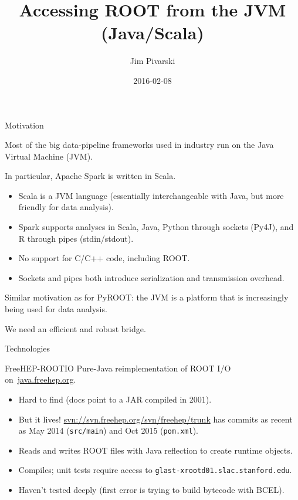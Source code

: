 \documentclass{beamer}
\title[2016-02-08-ROOT-JVM-firsttalk]{Accessing ROOT from the JVM (Java/Scala)}
\author{Jim Pivarski}
\date{2016-02-08}
\begin{document}
\begin{frame}
  \titlepage
\end{frame}


\begin{frame}{Motivation}
\begin{block}{}
Most of the big data-pipeline frameworks used in industry run on the Java Virtual Machine (JVM).
\end{block}

\begin{block}{}
\vspace{-\baselineskip}
In particular, Apache Spark is written in Scala.
\begin{itemize}
\item Scala is a JVM language (essentially interchangeable with Java, but more friendly for data analysis).
\item Spark supports analyses in Scala, Java, Python through sockets (Py4J), and R through pipes (stdin/stdout).
\item No support for C/C++ code, including ROOT.
\item Sockets and pipes both introduce serialization and transmission overhead.
\end{itemize}
\end{block}

\begin{block}{}
\vspace{-\baselineskip}
Similar motivation as for PyROOT: the JVM is a platform that is increasingly being used for data analysis.

\vspace{0.5\baselineskip}
We need an efficient and robust bridge.
\end{block}
\end{frame}

\begin{frame}{Technologies}

\begin{block}{FreeHEP-ROOTIO}
Pure-Java reimplementation of ROOT I/O \mbox{on \url{java.freehep.org}.\hspace{-1 cm}}
\begin{itemize}
\item Hard to find (docs point to a JAR compiled in 2001).
\item But it lives! \url{svn://svn.freehep.org/svn/freehep/trunk} has commits as recent as May 2014 ({\tt src/main}) and Oct 2015 ({\tt pom.xml}).
\item Reads and writes ROOT files with Java reflection to create runtime objects.
\item Compiles; unit tests require access to {\tt glast-xrootd01.slac.stanford.edu}.
\item Haven't tested deeply (first error is trying to build bytecode with BCEL).
\end{itemize}
\end{block}
\end{frame}
\end{document}
